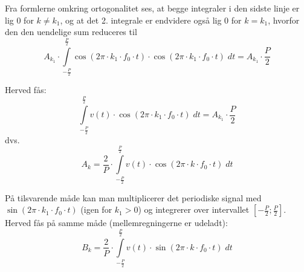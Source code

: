 \documentclass[11pt,a4paper]{article}
\begin{document}
\noindent{}Fra formlerne omkring ortogonalitet ses, at begge integraler i den sidste linje er lig 0 for $k\ne{}k_{1}$, og at det 2. integrale er endvidere også lig 0 for $k=k_1$, hvorfor den den uendelige sum reduceres til
\begin{equation}
A_{k_1}\cdot\int\limits_{-\frac{P}{2}}^{\frac{P}{2}}\cos(2\pi\cdot{}k_{1}\cdot{}f_{0}\cdot{}t)\cdot\cos(2\pi\cdot{}k_{1}\cdot{}f_{0}\cdot{}t)\;dt = A_{k_1}\cdot\frac{P}{2}
\end{equation}

\noindent{}Herved fås:
\begin{equation}
\int\limits_{-\frac{P}{2}}^{\frac{P}{2}}v(t)\cdot\cos(2\pi\cdot{}k_{1}\cdot{}f_{0}\cdot{}t)\;dt = A_{k_1}\cdot\frac{P}{2}
\end{equation}
dvs.
\begin{equation}
A_{k}=\frac{2}{P}\cdot\int\limits_{-\frac{P}{2}}^{\frac{P}{2}}v(t)\cdot\cos(2\pi\cdot{}k\cdot{}f_{0}\cdot{}t)\;dt\label{eq:akoeff}
\end{equation}

\noindent{}På tilsvarende måde kan man multiplicerer det periodiske signal med $\sin(2\pi\cdot{}k_{1}\cdot{}f_{0}\cdot{}t)$ (igen for $k_1>0$) og integrerer over intervallet $\left[ -\frac{P}{2} ; \frac{P}{2} \right]$. Herved fås på samme måde (mellemregningerne er udeladt):
\begin{equation}
B_{k}=\frac{2}{P}\cdot\int\limits_{-\frac{P}{2}}^{\frac{P}{2}}v(t)\cdot\sin(2\pi\cdot{}k\cdot{}f_{0}\cdot{}t)\;dt\label{eq:bkoeff}
\end{equation}
\end{document}

